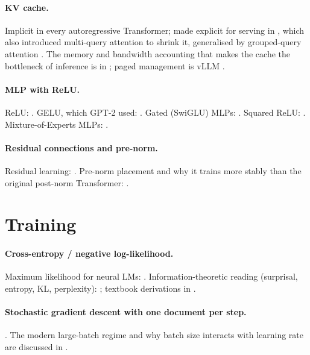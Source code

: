 \documentclass[10pt,letterpaper]{article}
\newcounter{q}
\begin{document}
\paragraph{KV cache.} Implicit in every autoregressive Transformer; made explicit for serving in \textcite{shazeer2019mqa}, which also introduced multi-query attention to shrink it, generalised by grouped-query attention \parencite{ainslie2023gqa}. The memory and bandwidth accounting that makes the cache the bottleneck of inference is in \textcite{pope2022efficiently}; paged management is vLLM \parencite{kwon2023vllm}.

\paragraph{MLP with ReLU.} ReLU: \textcite{nair2010relu,glorot2011relu}. GELU, which GPT-2 used: \textcite{hendrycks2016gelu}. Gated (SwiGLU) MLPs: \textcite{shazeer2020glu}. Squared ReLU: \textcite{so2021primer}. Mixture-of-Experts MLPs: \textcite{shazeer2017moe,fedus2022switch,deepseek2024v3}.

\paragraph{Residual connections and pre-norm.} Residual learning: \textcite{he2016resnet}. Pre-norm placement and why it trains more stably than the original post-norm Transformer: \textcite{xiong2020prelayernorm}.

\section{Training}

\paragraph{Cross-entropy / negative log-likelihood.} Maximum likelihood for neural LMs: \textcite{bengio2003neural}. Information-theoretic reading (surprisal, entropy, KL, perplexity): \textcite{shannon1948mathematical,cover2006elements}; textbook derivations in \textcite{goodfellow2016deep,bishop2006prml}.

\paragraph{Stochastic gradient descent with one document per step.} \textcite{robbins1951stochastic}. The modern large-batch regime and why batch size interacts with learning rate are discussed in \textcite{kaplan2020scaling}.
\end{document}
